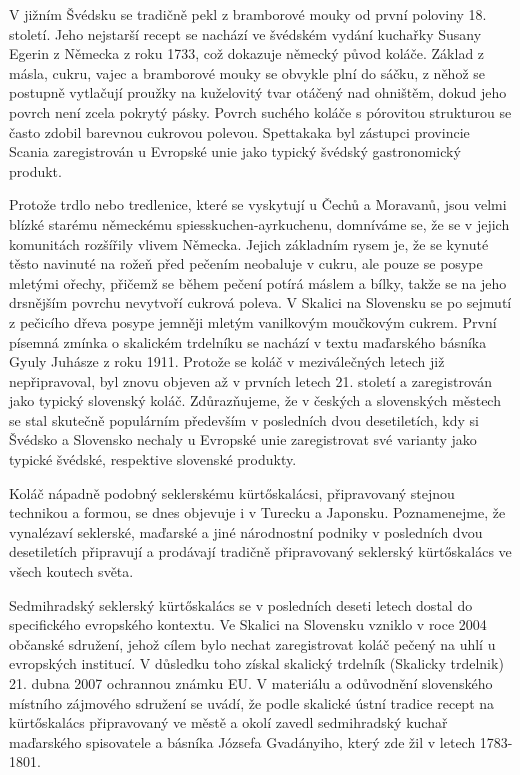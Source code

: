 V jižním Švédsku se tradičně pekl z bramborové mouky od první poloviny
18. století. Jeho nejstarší recept se nachází ve švédském vydání
kuchařky Susany Egerin z Německa z roku 1733, což dokazuje německý původ
koláče. Základ z másla, cukru, vajec a bramborové mouky se obvykle plní
do sáčku, z něhož se postupně vytlačují proužky na kuželovitý tvar
otáčený nad ohništěm, dokud jeho povrch není zcela pokrytý pásky. Povrch
suchého koláče s pórovitou strukturou se často zdobil barevnou cukrovou
polevou. Spettakaka byl zástupci provincie Scania zaregistrován u
Evropské unie jako typický švédský gastronomický produkt.

Protože trdlo nebo tredlenice, které se vyskytují u Čechů a Moravanů,
jsou velmi blízké starému německému spiesskuchen-ayrkuchenu, domníváme
se, že se v jejich komunitách rozšířily vlivem Německa. Jejich základním
rysem je, že se kynuté těsto navinuté na rožeň před pečením neobaluje v
cukru, ale pouze se posype mletými ořechy, přičemž se během pečení
potírá máslem a bílky, takže se na jeho drsnějším povrchu nevytvoří
cukrová poleva. V Skalici na Slovensku se po sejmutí z pečicího dřeva
posype jemněji mletým vanilkovým moučkovým cukrem. První písemná zmínka
o skalickém trdelníku se nachází v textu maďarského básníka Gyuly
Juhásze z roku 1911. Protože se koláč v meziválečných letech již
nepřipravoval, byl znovu objeven až v prvních letech 21. století a
zaregistrován jako typický slovenský koláč. Zdůrazňujeme, že v českých a
slovenských městech se stal skutečně populárním především v posledních
dvou desetiletích, kdy si Švédsko a Slovensko nechaly u Evropské unie
zaregistrovat své varianty jako typické švédské, respektive slovenské
produkty.

Koláč nápadně podobný seklerskému kürtőskalácsi, připravovaný stejnou
technikou a formou, se dnes objevuje i v Turecku a Japonsku.
Poznamenejme, že vynalézaví seklerské, maďarské a jiné národnostní
podniky v posledních dvou desetiletích připravují a prodávají tradičně
připravovaný seklerský kürtőskalács ve všech koutech světa.

Sedmihradský seklerský kürtőskalács se v posledních deseti letech dostal
do specifického evropského kontextu. Ve Skalici na Slovensku vzniklo v
roce 2004 občanské sdružení, jehož cílem bylo nechat zaregistrovat koláč
pečený na uhlí u evropských institucí. V důsledku toho získal skalický
trdelník (Skalicky trdelnik) 21. dubna 2007 ochrannou známku EU. V
materiálu a odůvodnění slovenského místního zájmového sdružení se uvádí,
že podle skalické ústní tradice recept na kürtőskalács připravovaný ve
městě a okolí zavedl sedmihradský kuchař maďarského spisovatele a
básníka Józsefa Gvadányiho, který zde žil v letech 1783-1801.

